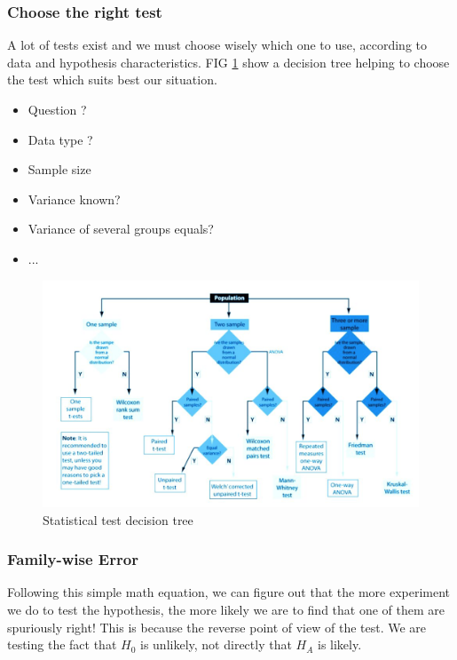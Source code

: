 \subsubsection{Choose the right test}

A lot of tests exist and we must choose wisely which one to use, according to data and hypothesis characteristics. FIG \ref{pic:testtree} show a decision tree helping to choose the test which suits best our situation.

\begin{itemize}
 \item Question ? 
 \item Data type ?
 \item Sample size
 \item Variance known? 
 \item Variance of several groups equals?
 \item ...
\end{itemize}

\begin{figure}[h]%
 \centering
 \includegraphics[width=15cm]{./img/05/choose_test}
 \caption{\label{pic:testtree} Statistical test decision tree}
\end{figure}


\subsubsection{Family-wise Error}

Following this simple math equation, we can figure out that the more experiment we do to test the hypothesis, the more likely we are to find that one of them are spuriously right! This is because the reverse point of view of the test. We are testing the fact that $H_0$ is unlikely, not directly that $H_A$ is likely. 

